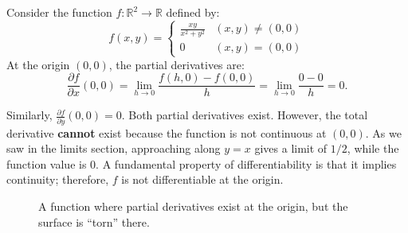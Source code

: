 	\begin{example}
	  \label{ex:partial-derivatives-exist-but-not-differentiable}
		Consider the function $f: \mathbb{R}^2 \to \mathbb{R}$ defined by:
		\begin{equation}
		  f(x, y) = \begin{cases} \frac{xy}{x^2 + y^2} & (x, y) \neq (0, 0) \\ 0 & (x, y) = (0, 0) \end{cases} 
		\end{equation}
		At the origin $(0, 0)$, the partial derivatives are:
		\begin{equation}
			\frac{\partial f}{\partial x}(0, 0) = \lim_{h \to 0} \frac{f(h, 0) - f(0, 0)}{h} = \lim_{h \to 0} \frac{0 - 0}{h} = 0. 
		\end{equation}

		Similarly, $\frac{\partial f}{\partial y}(0, 0) = 0$. Both partial derivatives exist. However, the total derivative \textbf{cannot} exist because the function is not continuous at $(0, 0)$. As we saw in the limits section, approaching along $y=x$ gives a limit of $1/2$, while the function value is $0$. A fundamental property of differentiability is that it implies continuity; therefore, $f$ is not differentiable at the origin.

		\begin{figure}[H]
			\centering
			\caption{A function where partial derivatives exist at the origin, but the surface is ``torn'' there.}
		\end{figure}
	\end{example}

